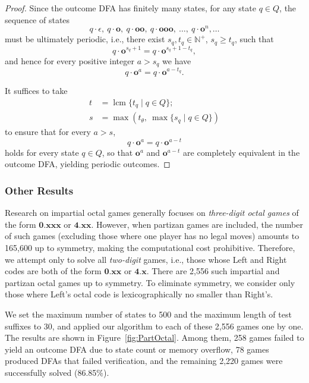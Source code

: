\documentclass[11pt]{article}
\theoremstyle{definition}
\theoremstyle{plain}
\newcommand{\e}{\mathbf{o}}
\begin{document}
\begin{proof}
    Since the outcome DFA has finitely many states, for any state $q\in Q$, the sequence of states
    \[
        q\cdot \epsilon,\ q\cdot \e,\ q\cdot \e\e,\ q\cdot\e\e\e,\ \ldots,\ q\cdot\e^n ,\ldots
    \]
    must be ultimately periodic, i.e., there exist $s_q, t_q\in\mathbb{N}^+$, $s_q\geq t_q$, such that
    \[
        q\cdot \e^{s_q+1} = q\cdot \e^{s_q+1-t_q},
    \]
    and hence for every positive integer $a>s_q$ we have
    \[
        q\cdot \e^a = q\cdot \e^{a-t_q}.
    \]

    It suffices to take
    \begin{align*}
        t &= \operatorname{lcm} \{t_q \mid q\in Q\};\\
        s &= \max(t_{\theta},\ \max \{s_q \mid q\in Q\})
    \end{align*}
    to ensure that for every $a>s$,
    \[
        q\cdot \e^a = q\cdot \e^{a-t}
    \]
    holds for every state $q\in Q$, so that $\e^a$ and $\e^{a-t}$ are completely equivalent in the outcome DFA, yielding periodic outcomes.
\end{proof}

\subsubsection{Other Results}

Research on impartial octal games generally focuses on \textit{three-digit octal games} of the form $\mathbf{0.xxx}$ or $\mathbf{4.xx}$.
However, when partizan games are included, the number of such games (excluding those where one player has no legal moves) amounts to 165,600 up to symmetry, making the computational cost prohibitive.
Therefore, we attempt only to solve all \textit{two-digit} games, i.e., those whose Left and Right codes are both of the form $\mathbf{0.xx}$ or $\mathbf{4.x}$.
There are 2,556 such impartial and partizan octal games up to symmetry.
To eliminate symmetry, we consider only those where Left's octal code is lexicographically no smaller than Right's.

We set the maximum number of states to 500 and the maximum length of test suffixes to 30, and applied our algorithm to each of these 2,556 games one by one.
The results are shown in Figure~\ref{fig:PartOctal}.
Among them, 258 games failed to yield an outcome DFA due to state count or memory overflow, 78 games produced DFAs that failed verification, and the remaining 2,220 games were successfully solved (86.85\%).
\end{document}
